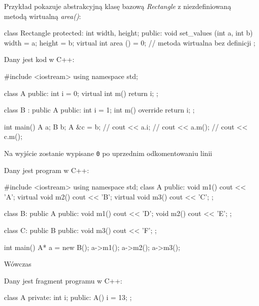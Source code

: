 \begin{example}
Przykład pokazuje abstrakcyjną klasę bazową \textit{Rectangle} z niezdefiniowaną metodą wirtualną \textit{area()}:
    \begin{cpp}
    class Rectangle {
      protected:
        int width, height;
      public:
        void set_values (int a, int b)
          { width = a; height = b; }
        virtual int area () = 0; // metoda wirtualna bez definicji
    };
    \end{cpp}
\end{example}

\begin{problems}
\prob Dany jest kod w C++:
\begin{cpp}
    #include <iostream>
    using namespace std;
    
    class A {
    public:
        int i = 0;
        virtual int m() { return i; }
    };
    
    class B : public A {
    public:
        int i = 1;
        int m() override { return i; }
    };
    
    int main() {
        A a;
        B b;
        A &c = b;
        // cout << a.i;
        // cout << a.m();
        // cout << c.m();
    }
\end{cpp}
Na wyjście zostanie wypisane \texttt{0} po uprzednim odkomentowaniu linii

\prob Dany jest program w C++:
\begin{cpp}
    #include <iostream>
    using namespace std;
    class A {
    public:
        void m1() { cout << 'A'; }
        virtual void m2() { cout << 'B'; }
        virtual void m3() { cout << 'C'; }
    };
    
    class B: public A {
    public:
        void m1() { cout << 'D'; }
        void m2() { cout << 'E'; }
    };
    
    class C: public B {
    public:
        void m3() { cout << 'F'; }
    };
    
    int main() {
        A* a = new B();
        a->m1();
        a->m2();
        a->m3();
    }
\end{cpp}
Wówczas

\prob Dany jest fragment programu w C++:
\begin{cpp}
    class A {
    private:
        int i;
    public:
        A() { i = 13; }
    };


\end{cpp}
\end{problems}
